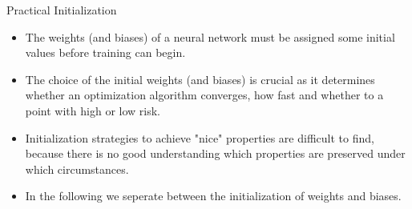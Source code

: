 











\begin{vbframe} {Practical Initialization}
  \begin{itemize}
    \item The weights (and biases) of a neural network must be assigned some initial values before training can begin.
    \item The choice of the initial weights (and biases) is crucial as it determines whether an optimization algorithm converges, how fast and whether to a point with high or low risk. 
    \item Initialization strategies to achieve "nice" properties are difficult to find, because there is no good understanding which properties are preserved under which circumstances. 
    \item In the following we seperate between the initialization of weights and biases. 
  \end{itemize}
  \end{vbframe}
  
